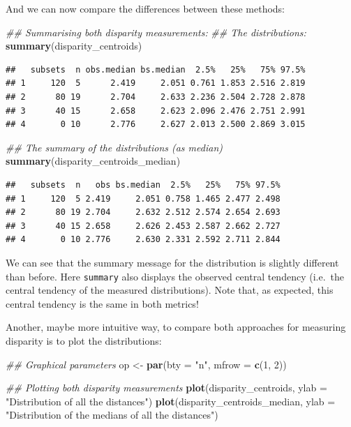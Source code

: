 \documentclass[]{book}
\newenvironment{Shaded}{\begin{snugshade}}{\end{snugshade}}
\newcommand{\CommentTok}[1]{\textcolor[rgb]{0.56,0.35,0.01}{\textit{#1}}}
\newcommand{\DataTypeTok}[1]{\textcolor[rgb]{0.13,0.29,0.53}{#1}}
\newcommand{\DecValTok}[1]{\textcolor[rgb]{0.00,0.00,0.81}{#1}}
\newcommand{\KeywordTok}[1]{\textcolor[rgb]{0.13,0.29,0.53}{\textbf{#1}}}
\newcommand{\NormalTok}[1]{#1}
\newcommand{\StringTok}[1]{\textcolor[rgb]{0.31,0.60,0.02}{#1}}
\begin{document}
And we can now compare the differences between these methods:

\begin{Shaded}
\begin{Highlighting}[]
\CommentTok{## Summarising both disparity measurements:}
\CommentTok{## The distributions:}
\KeywordTok{summary}\NormalTok{(disparity_centroids)}
\end{Highlighting}
\end{Shaded}

\begin{verbatim}
##   subsets  n obs.median bs.median  2.5%   25%   75% 97.5%
## 1     120  5      2.419     2.051 0.761 1.853 2.516 2.819
## 2      80 19      2.704     2.633 2.236 2.504 2.728 2.878
## 3      40 15      2.658     2.623 2.096 2.476 2.751 2.991
## 4       0 10      2.776     2.627 2.013 2.500 2.869 3.015
\end{verbatim}

\begin{Shaded}
\begin{Highlighting}[]
\CommentTok{## The summary of the distributions (as median)}
\KeywordTok{summary}\NormalTok{(disparity_centroids_median)}
\end{Highlighting}
\end{Shaded}

\begin{verbatim}
##   subsets  n   obs bs.median  2.5%   25%   75% 97.5%
## 1     120  5 2.419     2.051 0.758 1.465 2.477 2.498
## 2      80 19 2.704     2.632 2.512 2.574 2.654 2.693
## 3      40 15 2.658     2.626 2.453 2.587 2.662 2.727
## 4       0 10 2.776     2.630 2.331 2.592 2.711 2.844
\end{verbatim}

We can see that the summary message for the distribution is slightly different than before.
Here \texttt{summary} also displays the observed central tendency (i.e.~the central tendency of the measured distributions).
Note that, as expected, this central tendency is the same in both metrics!

Another, maybe more intuitive way, to compare both approaches for measuring disparity is to plot the distributions:

\begin{Shaded}
\begin{Highlighting}[]
\CommentTok{## Graphical parameters}
\NormalTok{op <-}\StringTok{ }\KeywordTok{par}\NormalTok{(}\DataTypeTok{bty =} \StringTok{"n"}\NormalTok{, }\DataTypeTok{mfrow =} \KeywordTok{c}\NormalTok{(}\DecValTok{1}\NormalTok{, }\DecValTok{2}\NormalTok{))}

\CommentTok{## Plotting both disparity measurements}
\KeywordTok{plot}\NormalTok{(disparity_centroids,}
     \DataTypeTok{ylab =} \StringTok{"Distribution of all the distances"}\NormalTok{)}
\KeywordTok{plot}\NormalTok{(disparity_centroids_median,}
     \DataTypeTok{ylab =} \StringTok{"Distribution of the medians of all the distances"}\NormalTok{)}
\end{Highlighting}
\end{Shaded}
\end{document}
